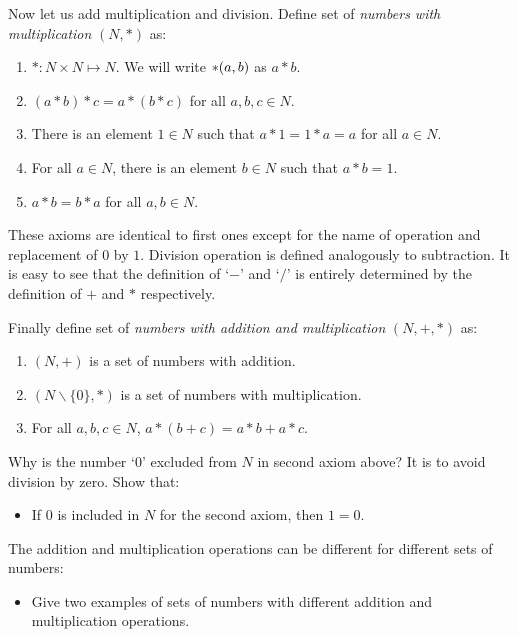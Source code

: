 \documentclass[]{article}
\begin{document}
Now let us add multiplication and division. Define set of {\em numbers with multiplication} $(N, *)$ as:
\begin{enumerate}
	\item $*: N\times N\mapsto N$. We will write $*\-(a,b)$ as $a*b$.
	\item $(a*b)*c = a*(b*c)$ for all $a, b, c\in N$.
	\item There is an element $1\in N$ such that $a*1 = 1*a = a$ for all $a\in N$.
	\item For all $a\in N$, there is an element $b\in N$ such that $a*b = 1$.
	\item $a*b = b*a$ for all $a, b\in N$.
\end{enumerate}
These axioms are identical to first ones except for the name of operation and replacement of $0$ by $1$. Division operation is defined analogously to subtraction. It is easy to see that the definition of `$-$' and `$/$' is entirely determined by the definition of $+$ and $*$ respectively.

Finally define set of {\em numbers with addition and multiplication} $(N, +, *)$ as:
\begin{enumerate}
	\item $(N, +)$ is a set of numbers with addition.
	\item $(N\backslash\{0\}, *)$ is a set of numbers with multiplication.
	\item For all $a, b, c \in N$, $a*(b+c) = a*b + a*c$.
\end{enumerate}

Why is the number `$0$' excluded from $N$ in second axiom above? It is to avoid division by zero. Show that:

\begin{itemize}
	\item If $0$ is included in $N$ for the second axiom, then $1 = 0$.
\end{itemize}

The addition and multiplication operations can be different for different sets of numbers:

\begin{itemize}
	\item Give two examples of sets of numbers with different addition and multiplication operations.
\end{itemize}
\end{document}
